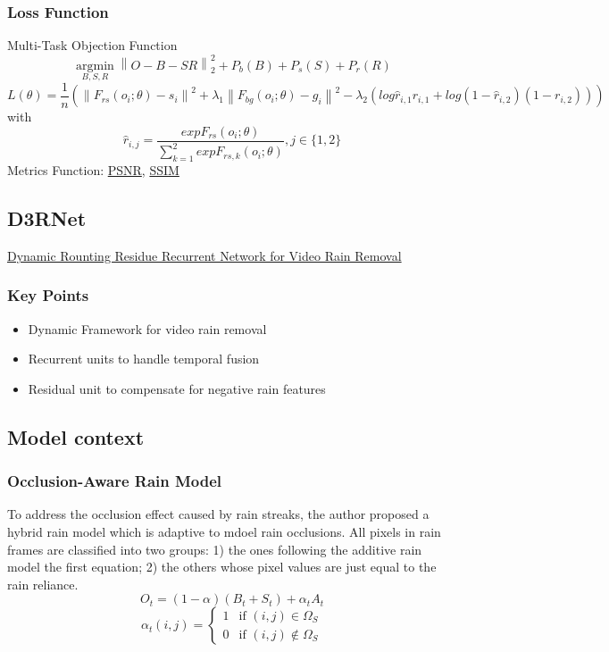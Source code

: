 \documentclass{article}
\newcommand\norm[1]{\left\lVert#1\right\rVert}
\begin{document}
\subsubsection{Loss Function}
Multi-Task Objection Function
\begin{equation}
\operatorname*{argmin}_{B,S,R}\norm{O-B-SR}_2^2+P_b(B)+P_s(S)+P_r(R)
\end{equation}
\begin{equation}
L(\theta)=\frac{1}{n}(\norm{F_{rs}(o_i;\theta)-s_i}^2+\lambda_1\norm{F_{bg}(o_i;\theta)-g_i}^2-\lambda_2(log\hat{r}_{i,1}r_{i,1}+log(1-\hat{r}_{i,2})(1-r_{i,2})))
\end{equation}
with 
\begin{equation}
\hat{r}_{i,j}=\frac{exp{F_{rs}(o_i;\theta)}}{\sum_{k=1}^{2}exp{F_{rs,k}(o_i;\theta)}},j\in{\{1,2\}}
\end{equation}
Metrics Function: \href{https://en.wikipedia.org/wiki/Peak_signal-to-noise_ratio}{PSNR}, \href{https://en.wikipedia.org/wiki/Structural_similarity}{SSIM}

\subsection{D3RNet}
\href{http://www.icst.pku.edu.cn/struct/Pub%20Files/2019/ywh_tip19.pdf}{Dynamic Rounting Residue Recurrent Network for Video Rain Removal}
\subsubsection{Key Points}
\begin{itemize}
\item Dynamic Framework for video rain removal
\item Recurrent units to handle temporal fusion
\item Residual unit to compensate for negative rain features
\end{itemize}
\subsection{Model context}
\subsubsection{Occlusion-Aware Rain Model}
To address the occlusion effect caused by rain streaks, the author proposed a hybrid rain model which is adaptive to mdoel rain occlusions. All pixels in rain frames are classified into two groups: 1) the ones following the additive rain model the first equation; 2) the others whose pixel values are just equal to the rain reliance.
\begin{equation}
O_t=(1-\alpha)(B_t+S_t)+\alpha_tA_t
\end{equation}
\begin{equation}
\alpha_t(i,j)=
	\begin{cases}
		1 & \text{if $(i,j)\in \Omega_S$}\\
		0 & \text{if $(i,j)\not\in \Omega_S$}
	\end{cases}
\end{equation}
\end{document}
